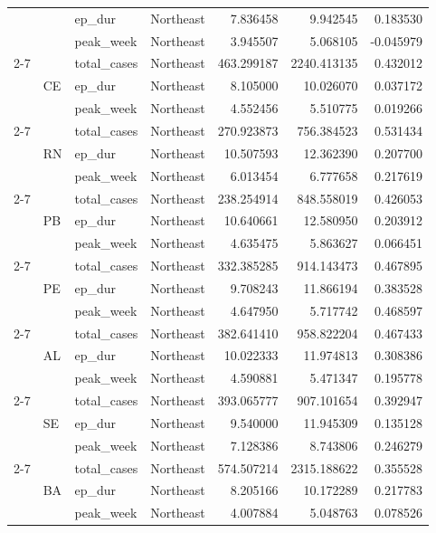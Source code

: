 \documentclass{report}
\begin{document}
\begin{center}
\begin{center}
\begin{longtable}{llllrrr}
 &  & ep\_dur & Northeast & 7.836458 & 9.942545 & 0.183530 \\
 &  & peak\_week & Northeast & 3.945507 & 5.068105 & -0.045979 \\
\cline{2-7}
 & \multirow[t]{3}{*}{CE} & total\_cases & Northeast & 463.299187 & 2240.413135 & 0.432012 \\
 &  & ep\_dur & Northeast & 8.105000 & 10.026070 & 0.037172 \\
 &  & peak\_week & Northeast & 4.552456 & 5.510775 & 0.019266 \\
\cline{2-7}
 & \multirow[t]{3}{*}{RN} & total\_cases & Northeast & 270.923873 & 756.384523 & 0.531434 \\
 &  & ep\_dur & Northeast & 10.507593 & 12.362390 & 0.207700 \\
 &  & peak\_week & Northeast & 6.013454 & 6.777658 & 0.217619 \\
\cline{2-7}
 & \multirow[t]{3}{*}{PB} & total\_cases & Northeast & 238.254914 & 848.558019 & 0.426053 \\
 &  & ep\_dur & Northeast & 10.640661 & 12.580950 & 0.203912 \\
 &  & peak\_week & Northeast & 4.635475 & 5.863627 & 0.066451 \\
\cline{2-7}
 & \multirow[t]{3}{*}{PE} & total\_cases & Northeast & 332.385285 & 914.143473 & 0.467895 \\
 &  & ep\_dur & Northeast & 9.708243 & 11.866194 & 0.383528 \\
 &  & peak\_week & Northeast & 4.647950 & 5.717742 & 0.468597 \\
\cline{2-7}
 & \multirow[t]{3}{*}{AL} & total\_cases & Northeast & 382.641410 & 958.822204 & 0.467433 \\
 &  & ep\_dur & Northeast & 10.022333 & 11.974813 & 0.308386 \\
 &  & peak\_week & Northeast & 4.590881 & 5.471347 & 0.195778 \\
\cline{2-7}
 & \multirow[t]{3}{*}{SE} & total\_cases & Northeast & 393.065777 & 907.101654 & 0.392947 \\
 &  & ep\_dur & Northeast & 9.540000 & 11.945309 & 0.135128 \\
 &  & peak\_week & Northeast & 7.128386 & 8.743806 & 0.246279 \\
\cline{2-7}
 & \multirow[t]{3}{*}{BA} & total\_cases & Northeast & 574.507214 & 2315.188622 & 0.355528 \\
 &  & ep\_dur & Northeast & 8.205166 & 10.172289 & 0.217783 \\
 &  & peak\_week & Northeast & 4.007884 & 5.048763 & 0.078526 \\

\end{longtable}
\end{center}
\end{center}
\end{document}
